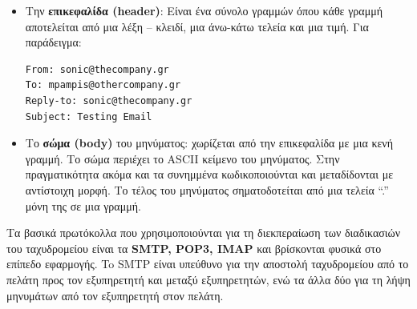 \begin{itemize}
\item Την \textbf{επικεφαλίδα (header)}: Είναι ένα σύνολο γραμμών όπου κάθε γραμμή αποτελείται από μια λέξη -- κλειδί, μια άνω-κάτω τελεία και μια τιμή. Για παράδειγμα:

\begin{verbatim}
From: sonic@thecompany.gr
To: mpampis@othercompany.gr
Reply-to: sonic@thecompany.gr
Subject: Testing Email
\end{verbatim}

\item Το \textbf{σώμα (body)} του μηνύματος: χωρίζεται από την επικεφαλίδα με μια κενή γραμμή. Το σώμα περιέχει το ASCII κείμενο του μηνύματος. Στην πραγματικότητα ακόμα και τα συνημμένα κωδικοποιούνται και μεταδίδονται με αντίστοιχη μορφή. Το τέλος του μηνύματος σηματοδοτείται από μια τελεία ``.'' μόνη της σε μια γραμμή.
\end{itemize}

Τα βασικά πρωτόκολλα που χρησιμοποιούνται για τη διεκπεραίωση των διαδικασιών του ταχυδρομείου είναι τα \textbf{SMTP, POP3, IMAP} και βρίσκονται φυσικά στο επίπεδο εφαρμογής. To SMTP είναι υπεύθυνο για την αποστολή ταχυδρομείου από το πελάτη προς τον εξυπηρετητή και μεταξύ εξυπηρετητών, ενώ τα άλλα δύο για τη λήψη μηνυμάτων από τον εξυπηρετητή στον πελάτη.

